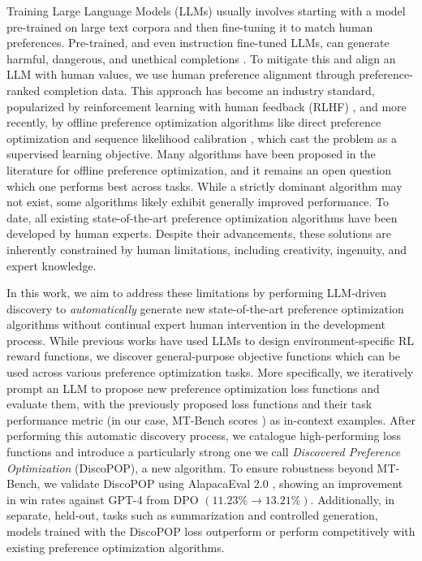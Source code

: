 \documentclass{article}
\theoremstyle{plain}
\theoremstyle{definition}
\theoremstyle{remark}
\begin{document}
Training Large Language Models (LLMs) usually involves starting with a model pre-trained on large text corpora and then fine-tuning it to match human preferences. Pre-trained, and even instruction fine-tuned LLMs, can generate harmful, dangerous, and unethical completions \citep{carlini2021extracting, gehman2020realtoxicityprompts}.
To mitigate this and align an LLM with human values, we use human preference alignment through preference-ranked completion data. This approach has become an industry standard, popularized by reinforcement learning with human feedback (RLHF) \citep[RLHF]{christiano2017deep}, and more recently, by offline preference optimization algorithms like direct preference optimization \citep[DPO]{rafailov2023direct} and sequence likelihood calibration \citep[SLiC]{zhao2023slic}, which cast the problem as a supervised learning objective.
Many algorithms have been proposed in the literature for offline preference optimization, and it remains an open question which one performs best across tasks. 
While a strictly dominant algorithm may not exist, some algorithms likely exhibit generally improved performance.
To date, all existing state-of-the-art preference optimization algorithms \citep{rafailov2023direct, azar2023general, zhao2023slic} have been developed by human experts. Despite their advancements, these solutions are inherently constrained by human limitations, including creativity, ingenuity, and expert knowledge.

In this work, we aim to address these limitations by performing LLM-driven discovery to \emph{automatically} generate new state-of-the-art preference optimization algorithms without continual expert human intervention in the development process. 
While previous works \citep{ma2023eureka, yu2023language} have used LLMs to design environment-specific RL reward functions, we discover general-purpose objective functions which can be used across various preference optimization tasks.
More specifically, we iteratively prompt an LLM to propose new preference optimization loss functions and evaluate them, with the previously proposed loss functions and their task performance metric (in our case, MT-Bench scores \citep{zheng2024judging}) as in-context examples. After performing this automatic discovery process, we catalogue high-performing loss functions and introduce a particularly strong one we call \textit{Discovered Preference Optimization} (DiscoPOP), a new algorithm.
To ensure robustness beyond MT-Bench, we validate DiscoPOP using AlapacaEval 2.0 \citep{dubois2024length}, showing an improvement in win rates against GPT-4 from DPO $(11.23\% \rightarrow 13.21\%)$.
Additionally, in separate, held-out, tasks such as summarization and controlled generation, models trained with the DiscoPOP loss outperform or perform competitively with existing preference optimization algorithms.
\end{document}
